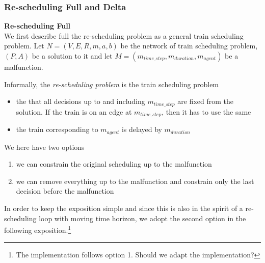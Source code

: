 \documentclass{article}
\begin{document}
\subsubsection{Re-scheduling Full and Delta}\label{subsubsec:Delta}


\textbf{Re-scheduling Full}
\\
We first describe full the re-scheduling problem as a general train scheduling problem. Let $N=(V,E,R,m,a,b)$ be the network of train scheduling problem, $(P,A)$ be a solution to it and let $M=(m_{time\_step},m_{duration},m_{agent})$ be a malfunction.

Informally, the \emph{re-scheduling problem} is the train scheduling problem
\begin{itemize}
    \item the that all decisions up to and including $m_{time\_step}$ are fixed from the solution. If the train is on an edge at $m_{time\_step}$, then it has to use the same
    \item the train corresponding to $m_{agent}$ is delayed by $m_{duration}$
\end{itemize}
We here have two options
\begin{enumerate}
    \item we can constrain the original scheduling up to the malfunction
    \item we can remove everything up to the malfunction and constrain only the last decision before the malfunction
\end{enumerate}
In order to keep the exposition simple and since this is also in the spirit of a re-scheduling loop with moving time horizon, we adopt the second option in the following exposition.\footnote{The implementation follows option 1. Should we adapt the implementation?}
%
\end{document}
